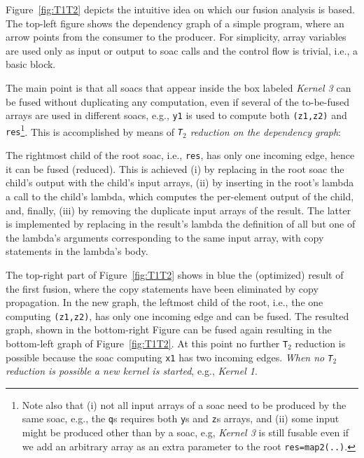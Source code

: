 \documentclass{sigplanconf}  %
\newcommand{\emp}[1]{\textcolor{DikuRed}{ #1}}
\begin{document}
Figure~\ref{fig:T1T2} depicts the intuitive idea on which
our fusion analysis is based.   The top-left figure shows
the dependency graph of a simple program, where an 
arrow points from the consumer to the producer. 
%
For simplicity, array variables are used only as input or 
output to {\sc soac} calls and the control flow is trivial,
i.e., a basic block. 

The main point is that all {\sc soac}s that appear inside the box
labeled \emp{\em Kernel 3} can be fused without duplicating any
computation, even if several of the to-be-fused 
arrays are used in different {\sc soac}s, e.g., {\tt y1} is used to
compute both {\tt (z1,z2)} and {\tt res}\footnote{
Note also that (i) not all input arrays of a {\sc soac} need to be produced
by the same {\sc soac}, e.g., the {\tt q}s requires both {\tt y}s and 
{\tt z}s arrays, and (ii) some input might be produced other than 
by a {\sc soac}, e.g, \emp{\em Kernel 3} is still fusable even if 
we add an arbitrary array as an extra parameter to the root {\tt res=map2(..)}. 
}. 
This is accomplished by means of {\em {\tt T$_2$} reduction on the dependency graph}:

The rightmost child of the root {\sc soac}, i.e., {\tt res}, 
has only one incoming edge, 
hence it can be fused (reduced). This is achieved  (i) by replacing in
the root {\sc soac} the child's output with the child's input arrays, 
(ii) by inserting in the root's lambda a call to the child's lambda,
which computes the per-element output of the child, %
and, finally, (iii) by removing the duplicate input arrays of the result.
The latter is implemented by replacing in the result's lambda
the definition of all but one of the lambda's arguments corresponding to 
the same input array, with copy statements in the lambda's body.  

The top-right part of Figure~\ref{fig:T1T2} shows in blue the (optimized) 
result of the first fusion, where the copy statements have been eliminated 
by copy propagation.   In the new graph, the leftmost child of the root, 
i.e., the one computing {\tt (z1,z2)}, has only one incoming edge 
and can be fused.  The resulted graph, shown in the bottom-right Figure
can be fused again resulting in the bottom-left graph of Figure~\ref{fig:T1T2}.
At this point no further {\tt T}$_2$ reduction is possible because
the {\sc soac} computing {\tt x1} has two incoming edges. 
%
{\em When no {\tt T}$_2$ reduction is possible a new kernel is started}, 
e.g., \emp{\em Kernel 1}.
\end{document}
